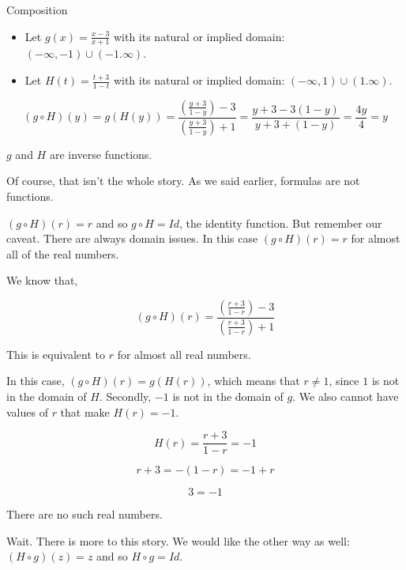 \documentclass{ximera}
\begin{document}
\begin{example} Composition



\begin{itemize}
\item Let $g(x) = \frac{x-3}{x+1}$ with its natural or implied domain: $(-\infty, -1) \cup (-1. \infty)$. 

\item Let $H(t) = \frac{t+3}{1-t}$ with its natural or implied domain: $(-\infty, 1) \cup (1. \infty)$.
\end{itemize}



\[
(g \circ H)(y) = g(H(y)) = \frac{\left( \frac{y+3}{1-y} \right) - 3}{\left(  \frac{y+3}{1-y}\right) + 1} = \frac{y+3-3(1-y)}{y+3+(1-y)} = \frac{4y}{4} = y
\]



$g$ and $H$ are inverse functions.




\end{example}

Of course, that isn't the whole story.  As we said earlier, formulas are not functions. 

$(g \circ H)(r) = r$ and so $g \circ H = Id$, the identity function.  But remember our caveat.  There are always domain issues.  In this case $(g \circ H)(r) = r$ for almost all of the real numbers.

We know that, 


\[
(g \circ H)(r) = \frac{\left( \frac{r+3}{1-r} \right) - 3}{\left(  \frac{r+3}{1-r}\right) + 1} 
\]


This is equivalent to $r$ for almost all real numbers.


In this case, $(g \circ H)(r) = g(H(r))$, which means that $r \ne 1$, since $1$ is not in the domain of $H$.  Secondly, $-1$ is not in the domain of $g$.  We also cannot have values of $r$ that make $H(r) = -1$.




\[
H(r) = \frac{r+3}{1-r} = -1
\]

\[
r + 3 = -(1-r) = -1 + r
\]


\[
3 = -1
\]


There are no such real numbers.


Wait.  There is more to this story. We would like the other way as well: $(H \circ g)(z) = z$ and so $H \circ g = Id$.
\end{document}
